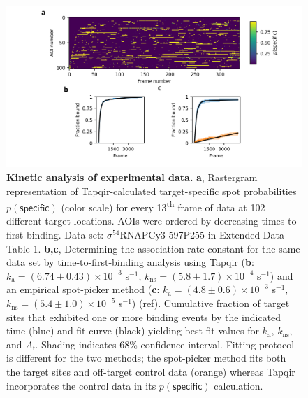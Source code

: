 \begin{figure}[h]
\centering
\includegraphics[width=\textwidth]{figures/figure7/figure7.png}
\caption{\textbf{Kinetic analysis of experimental data.}   \textbf{a}, Rastergram representation of Tapqir-calculated target-specific spot  probabilities $p(\mathsf{specific})$ (color scale) for every 13\textsuperscript{th} frame of data at 102 different target locations.  AOIs were ordered by decreasing times-to-first-binding. Data set: $\sigma^{54}$RNAPCy3-597P255 in Extended Data Table 1. \textbf{b,c}, Determining the association rate constant for the same data set by  time-to-first-binding analysis using Tapqir (\textbf{b}: $k_\mathrm{a} = (6.74\pm0.43) \times 10^{-3}$ s$^{-1}$, $k_\mathrm{ns} = (5.8\pm1.7) \times 10^{-4}$ s$^{-1}$) and an empirical spot-picker method (\textbf{c}: $k_\mathrm{a} = (4.8\pm0.6) \times 10^{-3}$ s$^{-1}$, $k_\mathrm{ns} = (5.4\pm1.0) \times 10^{-5}$ s$^{-1}$) (ref).   Cumulative fraction of target sites that exhibited one or more binding events by the indicated time (blue) and fit curve (black) yielding best-fit values for $k_\mathrm{a}$, $k_\mathrm{ns}$, and $A_\mathrm{f}$. Shading indicates 68\% confidence interval. Fitting protocol is different for the two methods; the spot-picker method fits both the target sites and off-target control data (orange) whereas Tapqir incorporates the control data in its $p(\mathsf{specific})$ calculation.
}
\label{fig:experimental_data}
\end{figure}